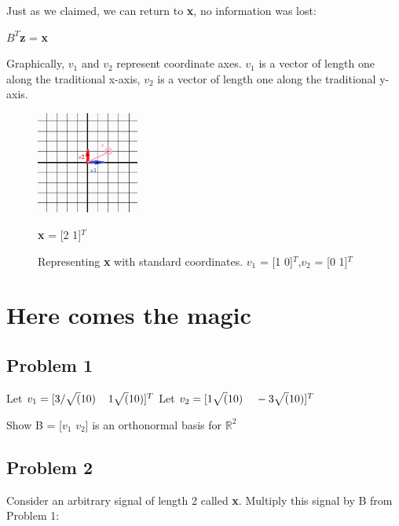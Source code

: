 \documentclass[11pt]{article}
\begin{document}
\vspace{3mm}
Just as we claimed, we can return to \textbf{x}, no information was lost:


\begin{center}

$B^{T}$\textbf{z} = \textbf{x}

\end{center}

\vspace{7mm}
Graphically, $v_1$ and $v_2$ represent coordinate axes.  $v_1$ is a vector of length one along the traditional x-axis, $v_2$ is a vector of length one along the traditional y-axis.

\vspace{20mm}
\begin{figure}[h]

\centering
\includegraphics[width=0.3\textwidth]{Standard Basis.png}
\caption {Representing \textbf{x} with standard coordinates. $v_1$ = [1 0]$^T$,$v_2$ = [0 1]$^T$} \textbf{x} = [2 1]$^T$
\end{figure}





\newpage
\section{Here comes the magic}
\subsection{Problem 1}
Let $v_1 = [3/\sqrt(10) \hspace{4mm}1\sqrt(10)]^T
$\newline
Let $v_2 = [1\sqrt(10) \hspace{4mm}-3\sqrt(10)]^T
$

\vspace{4mm}
Show B  = [$v_1$ $v_2$] is an orthonormal basis for $\mathbb{R}^2$

\subsection{Problem 2}
Consider an arbitrary signal of length 2 called \textbf{x}. Multiply this signal by B from Problem 1:
\end{document}
